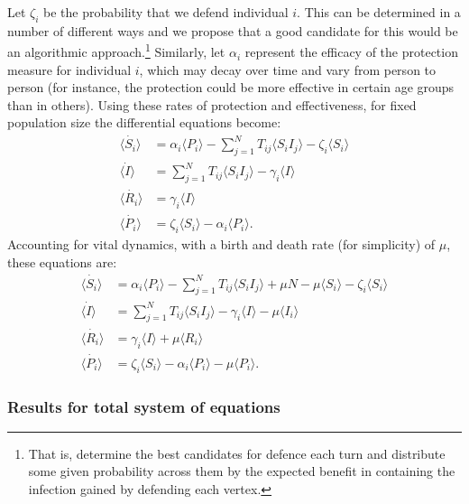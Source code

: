 \documentclass[../report.tex]{subfiles}
\begin{document}
Let $\zeta_i$ be the probability that we defend individual $i$. This can be determined in a number of different ways and we propose that a good candidate for this would be an algorithmic approach.\footnote{That is, determine the best candidates for defence each turn and distribute some given probability across them by the expected benefit in containing the infection gained by defending each vertex.} Similarly, let $\alpha_i$ represent the efficacy of the protection measure for individual $i$, which may decay over time and vary from person to person (for instance, the protection could be more effective in certain age groups than in others). Using these rates of protection and effectiveness, for fixed population size the differential equations become:
\begin{align}
\dot{\langle S_i \rangle} & = \alpha_i \langle P_i \rangle - \sum^{N}_{j=1}T_{ij} \langle S_i I_j \rangle - \zeta_i\langle S_i \rangle\\
\dot{\langle I \rangle} & =\sum^{N}_{j=1}T_{ij}\langle S_i I_j \rangle - \gamma_i \langle I \rangle \\
\dot{\langle R_i \rangle} & = \gamma_i \langle I \rangle \\
\dot{\langle P_i \rangle} & = \zeta_i \langle S_i \rangle - \alpha_i \langle P_i \rangle.
\end{align} 
Accounting for vital dynamics, with a birth and death rate (for simplicity) of $\mu$, these equations are:
\begin{align}
\dot{\langle S_i \rangle} & = \alpha_i \langle P_i \rangle - \sum^{N}_{j=1}T_{ij} \langle S_i I_j \rangle + \mu N - \mu \langle S_i \rangle - \zeta_i\langle S_i \rangle\\
\dot{\langle I \rangle} & =\sum^{N}_{j=1}T_{ij}\langle S_i I_j \rangle - \gamma_i \langle I \rangle - \mu \langle I_i \rangle\\
\dot{\langle R_i \rangle} & = \gamma_i \langle I \rangle + \mu \langle R_i \rangle\\
\dot{\langle P_i \rangle} & = \zeta_i \langle S_i \rangle - \alpha_i \langle P_i \rangle - \mu \langle P_i \rangle.
\end{align}

\subsubsection{Results for total system of equations}
\end{document}
